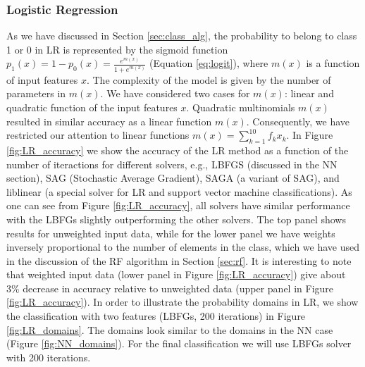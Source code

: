\subsubsection{Logistic Regression}

As we have discussed in Section \ref{sec:class_alg}, 
the probability to belong to class 1 or 0 in LR is represented by the sigmoid function
$p_1(x) = 1 - p_0(x) = \frac{e^{m(x)}}{1 + e^{m(x)}}$ (Equation \ref{eq:logit}),
where $m(x)$ is a function of input features $x$.
The complexity of the model is given by the number of parameters in $m(x)$.
We have considered two cases for $m(x)$: linear and quadratic function of the input features $x$.
Quadratic multinomials $m(x)$ resulted in similar accuracy as a linear function $m(x)$.
Consequently, we have restricted our attention to linear functions $m(x) = \sum_{k = 1}^{10} f_k x_k$.
In Figure \ref{fig:LR_accuracy} we show the accuracy of the LR method as a function of the number of iteractions
for different solvers, e.g., LBFGS (discussed in the NN section), SAG (Stochastic Average Gradient), SAGA (a variant of SAG),
and liblinear (a special solver for LR and support vector machine classifications).
As one can see from Figure \ref{fig:LR_accuracy}, all solvers have similar performance with the LBFGs slightly outperforming the other solvers.
The top panel shows results for unweighted input data, while for the lower panel we have weights inversely proportional to the number
of elements in the class, which we have used in the discussion of the RF algorithm in Section \ref{sec:rf}.
It is interesting to note that weighted input data (lower panel in Figure \ref{fig:LR_accuracy}) give about 3\% decrease in accuracy relative to unweighted data (upper panel in Figure \ref{fig:LR_accuracy}).
In order to illustrate the probability domains in LR, we show the classification with two features (LBFGs, 200 iterations)
in Figure \ref{fig:LR_domains}. The domains look similar to the domains in the NN case (Figure \ref{fig:NN_domains}).
For the final classification we will use LBFGs solver with 200 iterations.


